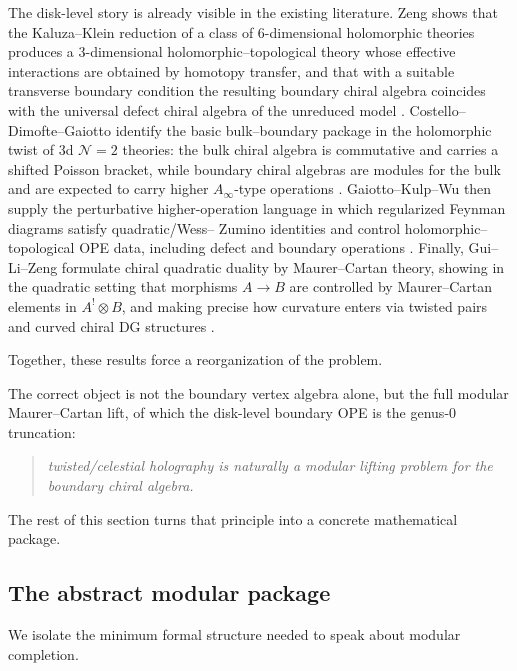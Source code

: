 The disk-level story is already visible in the existing literature. Zeng shows that the
Kaluza--Klein reduction of a class of $6$-dimensional holomorphic theories produces a
$3$-dimensional holomorphic--topological theory whose effective interactions are obtained by
homotopy transfer, and that with a suitable transverse boundary condition the resulting
boundary chiral algebra coincides with the universal defect chiral algebra of the unreduced
model \cite{ZengTwistedHolography}. Costello--Dimofte--Gaiotto identify the basic
bulk--boundary package in the holomorphic twist of $3$d $\mathcal N=2$ theories: the bulk
chiral algebra is commutative and carries a shifted Poisson bracket, while boundary chiral
algebras are modules for the bulk and are expected to carry higher $A_\infty$-type operations
\cite{CostelloDimofteGaiottoBoundary}. Gaiotto--Kulp--Wu then supply the perturbative
higher-operation language in which regularized Feynman diagrams satisfy quadratic/Wess--
Zumino identities and control holomorphic--topological OPE data, including defect and
boundary operations \cite{GKW25}. Finally, Gui--Li--Zeng formulate chiral
quadratic duality by Maurer--Cartan theory, showing in the quadratic setting that morphisms
$A\to B$ are controlled by Maurer--Cartan elements in $A^!\otimes B$, and making precise
how curvature enters via twisted pairs and curved chiral DG structures
\cite{GuiLiZengQuadraticDuality}.

Together, these results force a reorganization of the problem.

The correct object is not the boundary vertex algebra alone, but the full modular
Maurer--Cartan lift, of which the disk-level boundary OPE is
the genus-$0$ truncation:
\begin{quote}
\emph{twisted/celestial holography is naturally a modular lifting problem for the boundary
chiral algebra.}
\end{quote}

The rest of this section turns that principle into a concrete mathematical package.

\subsection{The abstract modular package}

We isolate the minimum formal structure needed to speak about modular completion.

